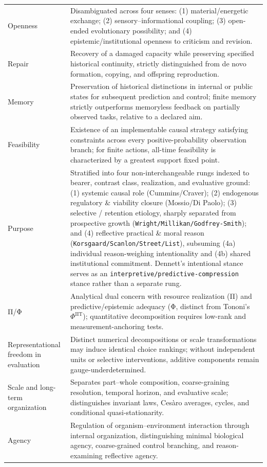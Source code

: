 \documentclass[
  english,
  11pt,
  oneside]{book}
\begin{document}
{\begin{longtable}[]{@{}
  >{\raggedright\arraybackslash}p{}
  >{\raggedright\arraybackslash}p{}@{}}
Openness & Disambiguated across four senses: (1) material/energetic exchange; (2) sensory--informational coupling; (3) open-ended evolutionary possibility; and (4) epistemic/institutional openness to criticism and revision. \\
Repair & Recovery of a damaged capacity while preserving specified historical continuity, strictly distinguished from de novo formation, copying, and offspring reproduction. \\
Memory & Preservation of historical distinctions in internal or public states for subsequent prediction and control; finite memory strictly outperforms memoryless feedback on partially observed tasks, relative to a declared aim. \\
Feasibility & Existence of an implementable causal strategy satisfying constraints across every positive-probability observation branch; for finite actions, all-time feasibility is characterized by a greatest support fixed point. \\
Purpose & Stratified into four non-interchangeable rungs indexed to bearer, contrast class, realization, and evaluative ground: (1) systemic causal role (Cummins/Craver); (2) endogenous regulatory \& viability closure (Mossio/Di Paolo); (3) selective / retention etiology, sharply separated from prospective growth (\nolinkurl{Wright/Millikan/Godfrey-Smith}); and (4) reflective practical \& moral reason (\nolinkurl{Korsgaard/Scanlon/Street/List}), subsuming (4a) individual reason-weighing intentionality and (4b) shared institutional commitment. Dennett's intentional stance serves as an \nolinkurl{interpretive/predictive-compression} stance rather than a separate rung. \\
Π/Φ & Analytical dual concern with resource realization (Π) and predictive/epistemic adequacy (Φ, distinct from Tononi's \(\Phi^{\mathrm{IIT}}\)); quantitative decomposition requires low-rank and measurement-anchoring tests. \\
Representational freedom in evaluation & Distinct numerical decompositions or scale transformations may induce identical choice rankings; without independent units or selective interventions, additive components remain gauge-underdetermined. \\
Scale and long-term organization & Separates part--whole composition, coarse-graining resolution, temporal horizon, and evaluative scale; distinguishes invariant laws, Cesàro averages, cycles, and conditional quasi-stationarity. \\
Agency & Regulation of organism--environment interaction through internal organization, distinguishing minimal biological agency, coarse-grained control branching, and reason-examining reflective agency. \\

\end{longtable}}
\end{document}
